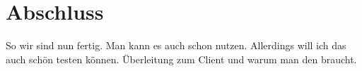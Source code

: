 \section{Abschluss}
So wir sind nun fertig. Man kann es auch schon nutzen. Allerdings will ich das auch schön testen können.
Überleitung zum Client und warum man den braucht.